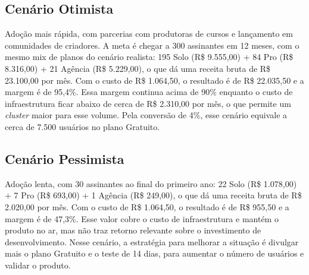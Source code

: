\subsection{Cenário Otimista}

Adoção mais rápida, com parcerias com produtoras de cursos e lançamento em comunidades de criadores. A meta é chegar a 300 assinantes em 12 meses, com o mesmo mix de planos do cenário realista: 195 Solo (R\$ 9.555,00) + 84 Pro (R\$ 8.316,00) + 21 Agência (R\$ 5.229,00), o que dá uma receita bruta de R\$ 23.100,00 por mês. Com o custo de R\$ 1.064,50, o resultado é de R\$ 22.035,50 e a margem é de 95,4\%. Essa margem continua acima de 90\% enquanto o custo de infraestrutura ficar abaixo de cerca de R\$ 2.310,00 por mês, o que permite um \textit{cluster} maior para esse volume. Pela conversão de 4\%, esse cenário equivale a cerca de 7.500 usuários no plano Gratuito.

\subsection{Cenário Pessimista}

Adoção lenta, com 30 assinantes ao final do primeiro ano: 22 Solo (R\$ 1.078,00) + 7 Pro (R\$ 693,00) + 1 Agência (R\$ 249,00), o que dá uma receita bruta de R\$ 2.020,00 por mês. Com o custo de R\$ 1.064,50, o resultado é de R\$ 955,50 e a margem é de 47,3\%. Esse valor cobre o custo de infraestrutura e mantém o produto no ar, mas não traz retorno relevante sobre o investimento de desenvolvimento. Nesse cenário, a estratégia para melhorar a situação é divulgar mais o plano Gratuito e o teste de 14 dias, para aumentar o número de usuários e validar o produto.